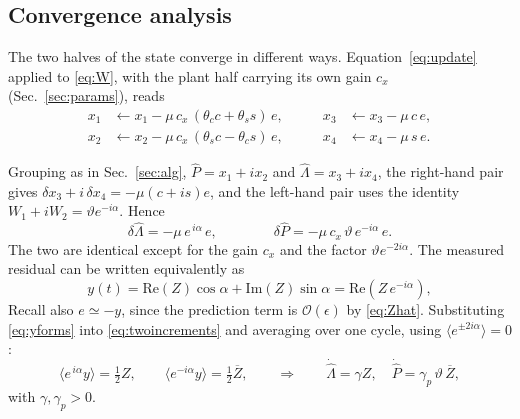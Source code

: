 \documentclass[11pt]{article}
\begin{document}
\subsection{Convergence analysis}
\label{sec:conv}

The two halves of the state converge in different ways. 
%
Equation~\eqref{eq:update} applied to \eqref{eq:W}, with the plant half carrying its own gain $c_x$ (Sec.~\ref{sec:params}), reads
%
\begin{equation}
\begin{aligned}
  x_1 &\leftarrow x_1-\mu\,c_x\,(\theta_c c+\theta_s s)\,e, &\qquad
  x_3 &\leftarrow x_3-\mu\,c\,e,\\
  x_2 &\leftarrow x_2-\mu\,c_x\,(\theta_s c-\theta_c s)\,e, &\qquad
  x_4 &\leftarrow x_4-\mu\,s\,e .
\end{aligned}
\label{eq:components}
\end{equation}

Grouping as in Sec.~\ref{sec:alg}, $\hat P=x_1+ix_2$ and
$\hat\Lambda=x_3+ix_4$, the right-hand pair gives
$\delta x_3+i\,\delta x_4=-\mu(c+is)e$, and the left-hand pair uses the
identity $W_1+iW_2=\vartheta e^{-i\alpha}$. Hence
%
\begin{equation}
  \delta\hat\Lambda=-\mu\,e^{\,i\alpha}\,e ,
  \qquad\qquad
  \delta\hat P=-\mu\,c_x\,\vartheta\,e^{-i\alpha}\,e .
  \label{eq:twoincrements}
\end{equation}
%
The two are identical except for the gain $c_x$ and the factor $\vartheta e^{-2i\alpha}$.
%
The measured residual can be written equivalently as
%
\begin{equation}
  y(t)=\mathrm{Re}(Z)\cos\alpha+\mathrm{Im}(Z)\sin\alpha
      =\mathrm{Re}\!\left(Z\,e^{-i\alpha}\right) ,
  \label{eq:yforms}
\end{equation}
%
Recall also $e\simeq-y$, since the prediction term is $\mathcal{O}(\epsilon)$ by \eqref{eq:Zhat}.
%
Substituting \eqref{eq:yforms} into \eqref{eq:twoincrements} and averaging over one cycle, using $\langle e^{\pm2i\alpha}\rangle=0$:
%
\begin{equation}
  \big\langle e^{\,i\alpha}y\big\rangle=\tfrac12 Z ,
  \qquad
  \big\langle e^{-i\alpha}y\big\rangle=\tfrac12\overline{Z} ,
  \qquad\Longrightarrow\qquad
  \dot{\hat\Lambda}=\gamma Z ,
  \quad
  \dot{\hat P}=\gamma_p\,\vartheta\,\overline{Z} ,
  \label{eq:twohalves}
\end{equation}
%
with $\gamma,\gamma_p>0$.
\end{document}
